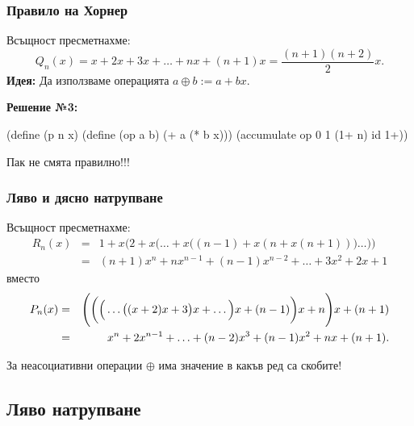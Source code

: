\documentclass{beamer}
\begin{document}
\begin{frame}[fragile]
  \frametitle{Правило на Хорнер}

Всъщност пресметнахме:
\begin{equation*}
  Q_n(x) = x + 2x + 3x + \ldots + nx + (n+1)x= \frac{(n+1)(n+2)}2x.
\end{equation*}
  \pause
  \textbf{Идея:} Да използваме операцията $a \oplus b := a + bx$.
  \vspace{1em}
  \pause

  \textbf{Решение №3:}
\begin{semiverbatim}
(define (p n x)
  (define (op a b) (+ a (* b x)))
  (accumulate op 0 1 (1+ n) id 1+))
\end{semiverbatim}

  \pause

  \alert{Пак не смята правилно!!!}

\end{frame}

\begin{frame}
  \frametitle{Ляво и дясно натрупване}

  Всъщност пресметнахме:
  \begin{eqnarray*}
    R_n(x) &=& 1+x\bigg(2+x\Big(\ldots+x\Big((n-1)+x(n+x(n+1))\Big)\ldots\Big)\bigg)\\
          &=&  (n+1)x^n + nx^{n-1} + (n-1)x^{n-2} + \ldots + 3x^2 + 2x + 1
  \end{eqnarray*}
  вместо
  \begin{eqnarray*}
    P_n(x) &=& \Bigg(\bigg(\Big(\ldots\big((x + 2)x + 3\big)x + \ldots\Big)x + (n-1)\bigg)x + n\Bigg)x + (n+1)\\
    &=& x^n + 2x^{n-1} + \ldots + (n-2)x^3 + (n-1)x^2 + nx + (n+1).
  \end{eqnarray*}

  \pause

  \alert{За неасоциативни  операции $\oplus$ има значение в какъв ред са скобите!}
\end{frame}

\subsection{Ляво натрупване}
\end{document}
